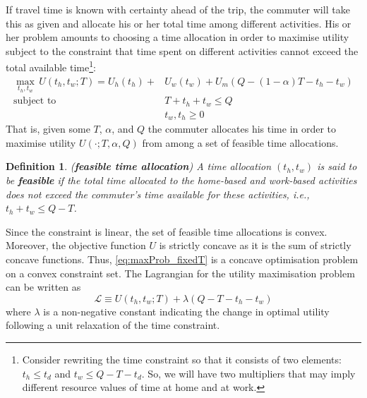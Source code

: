 \documentclass[12pt,a4paper,british]{article}
\newtheorem{definition}{Definition}[section]
\begin{document}
If travel time is known with certainty ahead of the trip, the commuter will take this as given and allocate his or her total time among different activities. His or her problem amounts to choosing a time allocation in order to maximise utility subject to the constraint that time spent on different activities cannot exceed the total available time\footnote{Consider rewriting the time constraint so that it consists of two elements: $t_h \leq t_d$ and $t_w \leq Q-T-t_d$. So, we will have two multipliers that may imply different resource values of time at home and at work.}:
\begin{equation}
\begin{aligned}
    \max_{t_{h},t_{w}} \, U\left(t_{h},t_{w};T\right) = U_{h} \left(t_{h}\right) + & U_{w}\left(t_{w}\right) + U_{m}\left( Q - \left(1-\alpha\right) T - t_{h} - t_{w} \right) \\
    \mbox{subject to} \quad & T + t_{h} + t_{w} \leq Q \\
                      \quad & t_w, t_h \geq 0 
\end{aligned}
\label{eq:maxProb_fixedT}
\end{equation}
That is, given some $T$, $\alpha$, and $Q$ the commuter allocates his time in order to maximise utility $U\left( \cdot; T, \alpha, Q \right)$ from among a set of feasible time allocations. 

\begin{definition}
(\textbf{feasible time allocation}) A time allocation $\left( t_h, t_w \right)$ is said to be \textbf{\textit{feasible}} if the total time allocated to the home-based and work-based activities does not exceed the commuter's time available for these activities, i.e., $t_h + t_w \leq Q - T$. 
\end{definition}

Since the constraint is linear, the set of feasible time allocations is convex. Moreover, the objective function $U$ is strictly concave as it is the sum of strictly concave functions. Thus, \eqref{eq:maxProb_fixedT} is a concave optimisation problem on a convex constraint set. The Lagrangian for the utility maximisation problem can be written as
\begin{equation*}
\mathcal{L} \equiv U\left(t_{h},t_{w};T\right) + \lambda \left(Q - T - t_{h} - t_{w}\right)
\end{equation*}%
where $\lambda$ is a non-negative constant indicating the change in optimal utility following a unit relaxation of the time constraint. 
\end{document}

